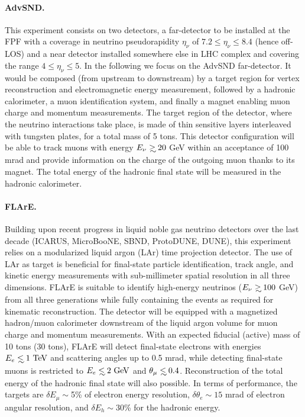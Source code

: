  \paragraph{AdvSND.}
 This experiment consists on  two detectors, a far-detector to be installed
 at the FPF with a coverage in neutrino pseudorapidity $\eta_\nu$ of $7.2 \le \eta_\nu \le 8.4$
 (hence off-LOS) and a near detector installed somewhere else in LHC
 complex and covering the range $4 \le \eta_\nu \le 5$.
 In the following we focus on the AdvSND far-detector.
 It would be
 composed (from upstream to downstream) by a target region
 for  vertex reconstruction and electromagnetic energy measurement, followed  by a hadronic calorimeter, a  muon identification system, and finally  a magnet enabling muon charge and momentum measurements.
 The target region of the detector, where the neutrino interactions take place, is made of thin sensitive layers interleaved with tungsten plates, for a total mass of 5 tons.
 This detector configuration will be able to track muons with energy $E_\nu \gsim 20$ GeV
 within an acceptance of 100 mrad and provide information on the charge
 of the  outgoing muon thanks to its magnet.
 The total energy of the hadronic final state will be measured
 in the hadronic calorimeter.

 \paragraph{FLArE.}
 Building upon recent progress in liquid noble gas neutrino detectors over the last decade (ICARUS, MicroBooNE, SBND, ProtoDUNE, DUNE), this experiment relies on a modularized liquid argon (LAr) time projection detector.
 The use of LAr as target is beneficial for final-state particle identification, track angle, and kinetic energy measurements with sub-millimeter spatial resolution in all three dimensions.
 FLArE is suitable to identify high-energy neutrinos ($E_\nu \gsim 100$ GeV)  from all three generations
 while  fully containing the events as required for kinematic reconstruction.
 The detector will be equipped with a magnetized hadron/muon calorimeter downstream of the liquid argon volume
 for muon charge and momentum measurements.
 With an expected fiducial (active) mass of 10 tons (30 tons), FLArE will
 detect final-state electrons with energies $E_{e}\lsim 1~\rm{TeV}$ and
 scattering angles up to 0.5 mrad, while detecting final-state muons
 is restricted to $E_{e}\lsim 2~\rm{GeV}$  and $\theta_\mu \lsim 0.4$.
 Reconstruction of the total energy of the hadronic final state will also
 possible. 
 In terms of performance, the targets
 are $\delta E_\mu \sim$5\% of electron energy resolution,
 $\delta \theta_e \sim 15$ mrad of electron angular  resolution,
 and $\delta E_h \sim 30$\% for the hadronic energy.

